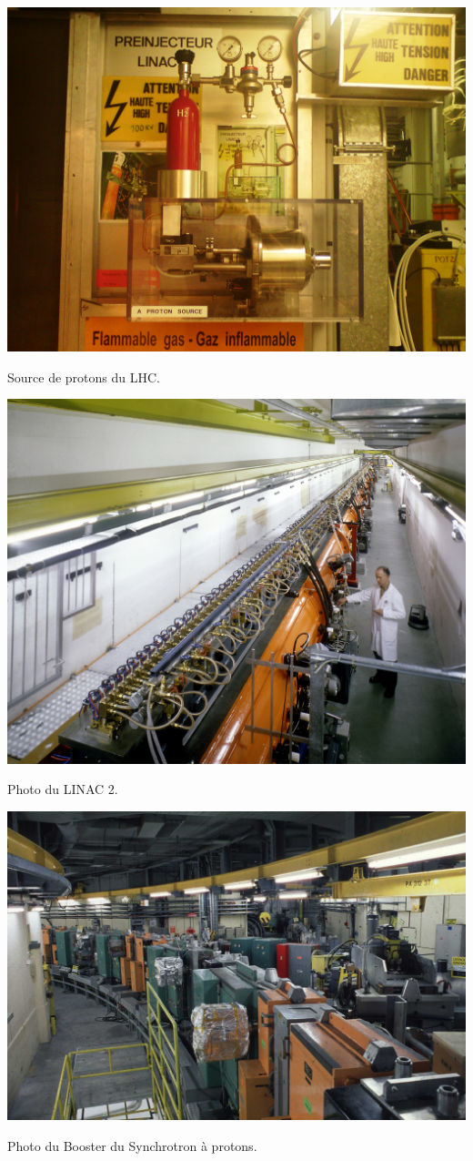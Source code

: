 \marginpar
{
	\includegraphics[width=\marginparwidth]{LHC/Bouteille.jpg}
	\captionsetup{type=figure}\caption{Source de protons du LHC.}
	\label{bouteille}	
}
\marginpar
{
	\includegraphics[width=\marginparwidth]{LHC/linac2.jpg}
    \captionsetup{type=figure}\caption{Photo du LINAC \num{2}.}
    	\label{linac2}
}

\marginpar
{
	
	\includegraphics[width=\marginparwidth]{LHC/booster.jpg}
    \captionsetup{type=figure}\caption{Photo du Booster du Synchrotron à protons.}
    	\label{booster}
}

